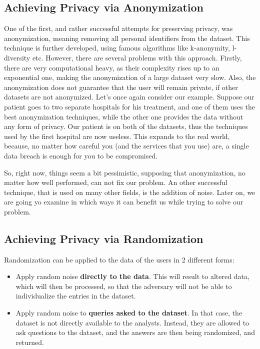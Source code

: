 \subsection{Achieving Privacy via Anonymization}

\par One of the first, and rather successful attempts for preserving privacy, was anonymization, meaning removing all personal identifiers from the dataset. This technique is further developed, using famous algorithms like k-anonymity, l-diversity etc. However, there are several problems with this approach. Firstly, there are very computational heavy, as their complexity rises up to an exponential one, making the anonymization of a large dataset very slow. Also, the anonymization does not guarantee that the user will remain private, if other datasets are not anonymized. Let's once again consider our example. Suppose our patient goes to two separate hospitals for his treatment, and one of them uses the best anonymization techniques, while the other one provides the data without any form of privacy. Our patient is on both of the datasets, thus the techniques used by the first hospital are now useless. This expands to the real world, because, no matter how careful you (and the services that you use) are, a single data breach is enough for you to be compromised. 

\par So, right now, things seem a bit pessimistic, supposing that anonymization, no matter how well performed, can not fix our problem. An other successful technique, that is used on many other fields, is the addition of noise. Later on, we are going yo examine in which ways it can benefit us while trying to solve our problem.

\subsection{Achieving Privacy via Randomization}

Randomization can be applied to the data of the users in 2 different forms:
\begin{itemize}
    \item Apply random noise \textbf{directly to the data}. This will result to altered data, which will then be processed, so that the adversary will not be able to individualize the entries in the dataset.
    \item Apply random noise to \textbf{queries asked to the dataset}. In that case, the dataset is not directly available to the analysts. Instead, they are allowed to ask questions to the dataset, and the answers are then being randomized, and returned.
\end{itemize}

